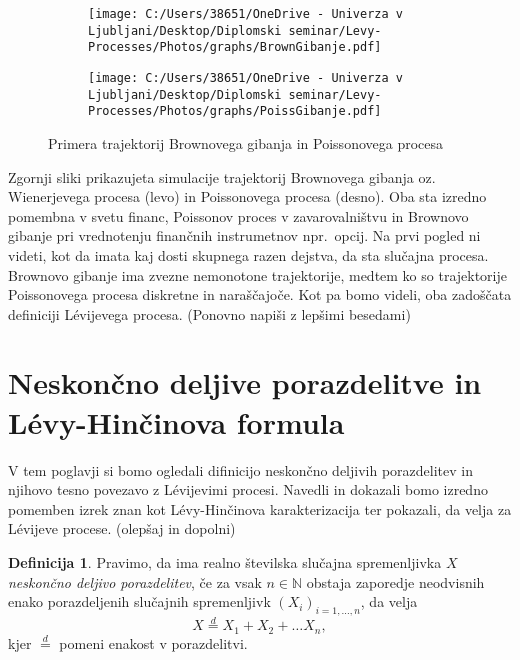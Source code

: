 \documentclass[12pt,a4paper]{amsart}
\theoremstyle{definition} %
\newtheorem{definicija}{Definicija}[section]
\theoremstyle{plain} %
\begin{document}
    \begin{figure}[H]
        \centering
        \begin{subfigure}{0.5\textwidth}
            \centering
            \texttt{[image: C:/Users/38651/OneDrive - Univerza v Ljubljani/Desktop/Diplomski seminar/Levy-Processes/Photos/graphs/BrownGibanje.pdf]}
        \end{subfigure}%
        \begin{subfigure}{0.5\textwidth}
            \centering
            \texttt{[image: C:/Users/38651/OneDrive - Univerza v Ljubljani/Desktop/Diplomski seminar/Levy-Processes/Photos/graphs/PoissGibanje.pdf]}
        \end{subfigure}
        \caption{Primera trajektorij Brownovega gibanja in Poissonovega procesa}
        \label{slika1}
    \end{figure}
       
    \noindent
    Zgornji sliki prikazujeta simulacije trajektorij Brownovega gibanja oz. Wienerjevega procesa (levo) in 
    Poissonovega procesa (desno). Oba sta izredno pomembna v svetu financ, Poissonov proces v zavarovalništvu in Brownovo
    gibanje pri vrednotenju finančnih instrumetnov npr.\ opcij. Na prvi pogled ni videti, kot da imata kaj dosti skupnega
    razen dejstva, da sta slučajna procesa. Brownovo gibanje ima zvezne nemonotone trajektorije, medtem ko so trajektorije 
    Poissonovega procesa diskretne in naraščajoče. Kot pa bomo videli, oba zadoščata definiciji Lévijevega procesa. (Ponovno napiši z lepšimi besedami)



\section{Neskončno deljive porazdelitve in Lévy-Hinčinova formula}
    V tem poglavji si bomo ogledali difinicijo neskončno deljivih porazdelitev in njihovo tesno povezavo
    z Lévijevimi procesi. Navedli in dokazali bomo izredno pomemben izrek znan kot Lévy-Hinčinova karakterizacija
    ter pokazali, da velja za Lévijeve procese. (olepšaj in dopolni)
    
    
    \begin{definicija}
        Pravimo, da ima realno številska slučajna spremenljivka $X$ \textit{neskončno deljivo porazdelitev}, če
        za vsak $n \in \mathbb{N}$ obstaja zaporedje neodvisnih enako porazdeljenih slučajnih spremenljivk $(X_i)_{i=1,\dots,n}$, 
        da velja 
        $$
        X \stackrel{d}{=} X_1 + X_2 + \dots X_n,
        $$
        kjer $\stackrel{d}{=}$ pomeni enakost v porazdelitvi.
    \end{definicija}
\end{document}
